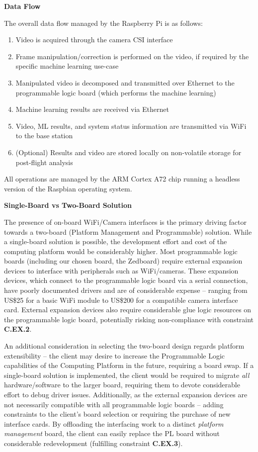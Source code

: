 \textbf{Data Flow}

The overall data flow managed by the Raspberry Pi is as follows:
\begin{enumerate}
\item Video is acquired through the camera CSI interface
\item Frame manipulation/correction is performed on the video, if required by the specific machine learning use-case
\item Manipulated video is decomposed and transmitted over Ethernet to the programmable logic board (which performs the machine learning)
\item Machine learning results are received via Ethernet
\item Video, ML results, and system status information are transmitted via WiFi to the base station
\item (Optional) Results and video are stored locally on non-volatile storage for post-flight analysis
\end{enumerate}

All operations are managed by the ARM Cortex A72 chip running a headless version of the Raspbian operating system. 

\textbf{Single-Board vs Two-Board Solution}

The presence of on-board WiFi/Camera interfaces is the primary driving factor towards a two-board (Platform Management and Programmable) solution. While a single-board solution is possible, the development effort and cost of the computing platform would be considerably higher. Most programmable logic boards (including our chosen board, the Zedboard) require external expansion devices to interface with peripherals such as WiFi/cameras. These expansion devices, which connect to the programmable logic board via a serial connection, have poorly documented drivers and are of considerable expense -- ranging from US\$25 for a basic WiFi module to US\$200 for a compatible camera interface card. External expansion devices also require considerable glue logic resources on the programmable logic board, potentially risking non-compliance with constraint \textbf{C.EX.2}.

An additional consideration in selecting the two-board design regards platform extensibility -- the client may desire to increase the Programmable Logic capabilities of the Computing Platform in the future, requiring a board swap. If a single-board solution is implemented, the client would be required to migrate \textit{all} hardware/software to the larger board, requiring them to devote considerable effort to debug driver issues. Additionally, as the external expansion devices are not necessarily compatible with all programmable logic boards -- adding constraints to the client's board selection or requiring the purchase of new interface cards. By offloading the interfacing work to a distinct \textit{platform management} board, the client can easily replace the PL board without considerable redevelopment (fulfilling constraint \textbf{C.EX.3}).

